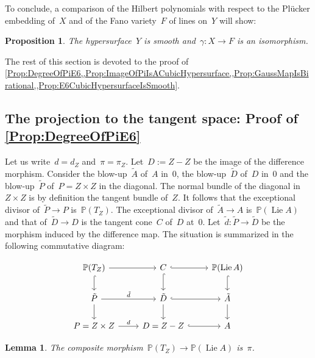\documentclass[a4paper]{amsart}
\newcommand{\bbP}{\mathbb{P}}
\DeclareMathOperator{\Lie}{Lie}
\theoremstyle{plain}
\newtheorem{lemma}[theorem]{Lemma}
\newtheorem{proposition}[theorem]{Proposition}
\theoremstyle{definition}
\numberwithin{equation}{section}
\begin{document}
To conclude, a comparison of the Hilbert polynomials with respect to the Pl\"ucker embedding of~$X$ and of the Fano variety~$F$ of lines on~$Y$ will show:

\begin{proposition} \label{Prop:E6CubicHypersurfaceIsSmooth}The hypersurface~$Y$ is smooth and~$\gamma \colon X \to F$ is an isomorphism.
\end{proposition}


The rest of this section is devoted to the proof of \cref{Prop:DegreeOfPiE6,,Prop:ImageOfPiIsACubicHypersurface,,Prop:GaussMapIsBirational,,Prop:E6CubicHypersurfaceIsSmooth}.



\subsection{The projection to the tangent space: Proof of \cref{Prop:DegreeOfPiE6}} 
Let us write~$d = d_Z$ and~$\pi = \pi_Z$. 
Let~$D:= Z - Z$ be the image of the difference morphism. Consider the blow-up~$\tilde{A}$ of~$A$ in~$0$, the blow-up~$\tilde{D}$ of~$D$ in~$0$ and the blow-up~$\tilde{P}$ of~$P = Z \times Z$ in the diagonal. The normal bundle of the diagonal in~$Z \times Z$ is by definition the tangent bundle of~$Z$. It follows that the exceptional divisor of~$\tilde{P} \to P$ is~$\bbP(T_Z)$. The exceptional divisor of~$\tilde{A} \to A$ is~$\bbP(\Lie A)$ and that of~$\tilde{D} \to D$ is the tangent cone~$C$ of~$D$ at~$0$. Let~$\tilde{d} \colon \tilde{P} \to \tilde{D}$ be the morphism induced by the difference map. The situation is summarized in the following commutative diagram:

\begin{equation} \label{eq:DiagramBlowUpE6}
\begin{tikzcd}
\bbP(T_Z) \ar[d, hook] \ar[r] & \ar[d, hook] C \ar[r, hook] & \bbP(\Lie A) \ar[d, hook]\\
\tilde{P} \ar[d] \ar[r, "\tilde{d}"] & \tilde{D} \ar[d] \ar[r, hook] & \tilde{A} \ar[d]  \\
P = Z \times Z \ar[r, "d"] & D = Z - Z \ar[r, hook]& A
\end{tikzcd}
\end{equation}

\begin{lemma} \label{Lemma:StrictTransformOfDifferenceMorphism} The composite morphism~$\bbP(T_Z) \to \bbP(\Lie A)$ is~$\pi$.
\end{lemma}
\end{document}
